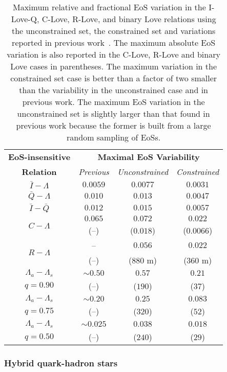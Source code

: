 \documentclass[prd,twocolumn,nofootinbib,superscriptaddress,amsmath,amssymb]{revtex4-1}
\begin{document}
\begin{table}[htb]
\centering
\begin{tabular}{ c  || c c c } 
 \hline
 \hline
 \textbf{EoS-insensitive} & \multicolumn{3}{c}{\textbf{Maximal EoS Variability}} \\
 \cline{2-4}
 \textbf{Relation} & \multicolumn{1}{c|}{\emph{Previous}} & \multicolumn{1}{c|}{\emph{Unconstrained}} & \emph{Constrained}\\
 \hline
 $\bar{I}-\Lambda$ &  $0.0059$ & $0.0077$ & $0.0031$\\
 $\bar{Q}-\Lambda$ & $0.010$ & $0.013$ & $0.0047$\\
 $\bar{I}-\bar{Q}$ & $0.012$ & $0.015$ & $0.0057$\\
 \hline
 \multirow{2}{*}{$C-\Lambda$} & $0.065$ & $0.072$ & $0.022$\\
 & (--) & ($0.018$) & ($0.0066$)\\
  \hline
 \multirow{2}{*}{$R-\Lambda$} & -- & $0.056$ & $0.022$\\
 & (--) & ($880 \text{ m}$) & ($360 \text{ m}$) \\
 \hline
 $\Lambda_a-\Lambda_s$ & $\sim0.50$ & $0.57$ & $0.21$\\
 $q=0.90$ & (--) & ($190$) & ($37$) \\
 \cline{1-1}
 $\Lambda_a-\Lambda_s$ & $\sim0.20$ & $0.25$ & $0.083$\\
  $q=0.75$ & (--) & ($320$) & ($52$) \\
  \cline{1-1}
 $\Lambda_a-\Lambda_s$ & $\sim0.025$ & $0.038$ & $0.018$\\
  $q=0.50$ & (--) & ($240$) & ($29$) \\
  \cline{1-1}
\hline
\hline
\end{tabular}
\caption{Maximum relative and fractional EoS variation in the I-Love-Q, C-Love, R-Love, and binary Love relations using the unconstrained set, the constrained set and variations reported in previous work~\cite{Yagi:ILQ,Yagi:binLove}. The maximum absolute EoS variation is also reported in the C-Love, R-Love and binary Love cases in parentheses. The maximum variation in the constrained set case is better than a factor of two smaller than the variability in the unconstrained case and in previous work. The maximum EoS variation in the unconstrained set is slightly larger than that found in previous work because the former is built from a large random sampling of EoSs. 
}
\label{tab:maxVar}
\end{table}

\subsubsection{Hybrid quark-hadron stars}
\label{sec:ilq-hyb}
\end{document}
